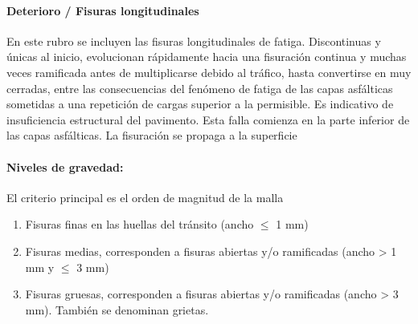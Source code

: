 \paragraph{Deterioro / Fisuras longitudinales}

	En este rubro se incluyen las fisuras longitudinales de fatiga. Discontinuas y únicas al inicio, evolucionan rápidamente hacia una fisuración continua y muchas veces ramificada antes de multiplicarse debido al tráfico, hasta convertirse en muy cerradas, entre las consecuencias del fenómeno de fatiga de las capas asfálticas sometidas a una repetición de cargas superior a la permisible. Es indicativo de insuficiencia estructural del pavimento. Esta falla comienza en la parte inferior de las capas asfálticas. La fisuración se propaga a la superficie
	\paragraph*{Niveles de gravedad:} El criterio principal es el orden de magnitud de la malla 
	\begin{enumerate}
		\renewcommand{\labelenumi}{\alph{enumi})} 
		\item Fisuras finas en las huellas del tránsito (ancho $\leq$ 1 mm)
		\item Fisuras medias, corresponden a fisuras abiertas y/o ramificadas (ancho > 1 mm y $\leq$ 3 mm)
		\item Fisuras gruesas, corresponden a fisuras abiertas y/o ramificadas (ancho > 3 mm). También se denominan grietas.
	\end{enumerate}

	
	
	
